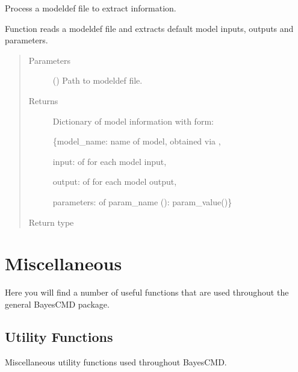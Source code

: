 \documentclass[letterpaper,10pt,english]{sphinxmanual}
\begin{document}

\begin{fulllineitems}
\label{\detokenize{jsonParsing:bayescmd.jsonParsing.modelJSON.modeldefParse}}
Process a modeldef file to extract information.

Function reads a modeldef file and extracts default model inputs, outputs
and parameters.
\begin{quote}\begin{description}
\item[{Parameters}] \leavevmode
{} () \textendash{} Path to modeldef file.

\item[{Returns}] \leavevmode

 \textendash{} Dictionary of model information with form:

\{model\_name: name of model, obtained via {\hyperref[\detokenize{jsonParsing:bayescmd.jsonParsing.modelJSON.get_model_name}]{}},

input:  of  for each model input,

output:  of  for each model output,

parameters:  of param\_name ():
param\_value()\}


\item[{Return type}] \leavevmode
{}

\end{description}\end{quote}

\end{fulllineitems}



\chapter{Miscellaneous}
\label{\detokenize{misc:miscellaneous}}\label{\detokenize{misc::doc}}
Here you will find a number of useful functions that are used throughout
the general BayesCMD package.


\section{Utility Functions}
\label{\detokenize{misc:utility-functions}}\label{\detokenize{misc:module-bayescmd.util}}
Miscellaneous utility functions used throughout BayesCMD.
\end{document}
